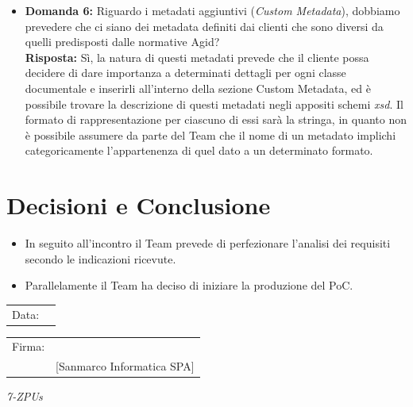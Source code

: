 \documentclass[a4paper,12pt]{article}
\begin{document}
\begin{itemize}
    \item \textbf{Domanda 6:} Riguardo i metadati aggiuntivi (\textit{Custom Metadata}), dobbiamo prevedere che ci siano dei metadata definiti dai clienti che sono diversi da quelli predisposti dalle normative Agid? 
    \\ \textbf{Risposta:} Sì, la natura di questi metadati prevede che il cliente possa decidere di dare importanza a determinati dettagli per ogni classe documentale e inserirli all'interno della sezione Custom Metadata, ed è possibile trovare la descrizione di questi metadati negli appositi schemi \textit{xsd}. Il formato di rappresentazione per ciascuno di essi sarà la stringa, in quanto non è possibile assumere da parte del Team che il nome di un metadato implichi categoricamente l'appartenenza di quel dato a un determinato formato.
\end{itemize}


\section{Decisioni e Conclusione}
\begin{itemize}
    \item In seguito all'incontro il Team prevede di perfezionare l'analisi dei requisiti secondo le indicazioni ricevute.
    \item Parallelamente il Team ha deciso di iniziare la produzione del PoC.
\end{itemize}



\vfill


\begin{flushleft}
\begin{tabular}{@{}p{0.5in}p{2in}@{}}
Data: & \hrulefill \\
\end{tabular}

\vspace{1em}

\begin{tabular}{@{}p{0.5in}p{2in}@{}}
Firma: & \hrulefill \\
& [Sanmarco Informatica SPA] \\
\end{tabular}
\end{flushleft}

\begin{flushright}
    \textit{7-ZPUs}
\end{flushright}
\end{document}
